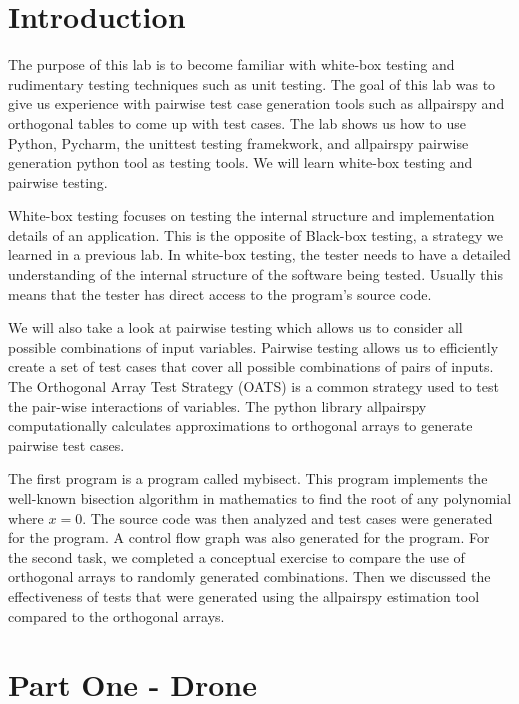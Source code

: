 \documentclass[12pt, letterpaper, titlepage]{article}
\begin{document}
 
\singlespacing

\section{Introduction}
The purpose of this lab is to become familiar with white-box testing and rudimentary testing techniques such as unit testing. The goal of this lab was to give us experience with pairwise test case generation tools such as allpairspy and orthogonal tables to come up with test cases. The lab shows us how to use Python, Pycharm, the unittest testing framekwork, and allpairspy pairwise generation python tool as testing tools. We will learn white-box testing and pairwise testing. 

White-box testing focuses on testing the internal structure and implementation details of an application. This is the opposite of Black-box testing, a strategy we learned in a previous lab. In white-box testing, the tester needs to have a detailed understanding of the internal structure of the software being tested. Usually this means that the tester has direct access to the program's source code. 

We will also take a look at pairwise testing which allows us to consider all possible combinations of input variables. Pairwise testing allows us to efficiently create a set of test cases that cover all possible combinations of pairs of inputs. The Orthogonal Array Test Strategy (OATS) is a common strategy used to test the pair-wise interactions of variables. The python library allpairspy computationally calculates approximations to orthogonal arrays to generate pairwise test cases.

The first program is a program called mybisect. This program implements the well-known bisection algorithm in mathematics to find the root of any polynomial where $x=0$. The source code was then analyzed and test cases were generated for the program. A control flow graph was also generated for the program. For the second task, we completed a conceptual exercise to compare the use of orthogonal arrays to randomly generated combinations. Then we discussed the effectiveness of tests that were generated using the allpairspy estimation tool compared to the orthogonal arrays.

\section{Part One - Drone}
\end{document}

